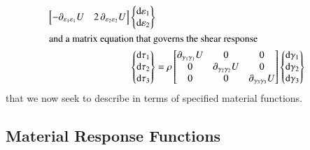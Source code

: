 \begin{subequations}
\begin{align}
\begin{bmatrix}
    - \partial_{\varepsilon_1 \varepsilon_1} U & 2 \, \partial_{\varepsilon_2 \varepsilon_2} U 
    \end{bmatrix}
    \left\{ \begin{matrix}
    \mathrm{d} \varepsilon_1 \\ \mathrm{d} \varepsilon_2 
    \end{matrix} \right\} \\
    \intertext{and a matrix equation that governs the shear response}
    \left\{ \begin{matrix} 
    \mathrm{d} \tau_1 \\ \mathrm{d} \tau_2 \\ \mathrm{d} \tau_3
    \end{matrix} \right\} & = \rho \begin{bmatrix}
    \partial_{\gamma_1\gamma_1} U & 0 & 0 \\
    0 & \partial_{\gamma_2\gamma_2} U & 0 \\
    0 & 0 & \partial_{\gamma_3\gamma_3} U
    \end{bmatrix}
    \left\{ \begin{matrix}
    \mathrm{d} \gamma_1 \\ \mathrm{d} \gamma_2 \\ \mathrm{d} \gamma_3
    \end{matrix} \right\}
    \end{align}
\end{subequations}
that we now seek to describe in terms of specified material functions.

\subsection{Material Response Functions}
\label{secMaterialConstants3D}

